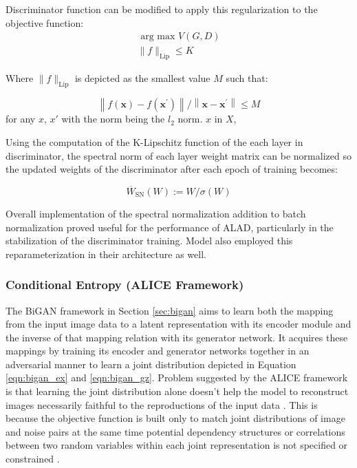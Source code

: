 Discriminator function can be modified to apply this regularization to the objective function: 
\begin{equation}
\begin{array}{l}{\text { arg max } V(G, D)} \\ {\|f\|_{\mathrm{Lip}} \leq K}\end{array} 
\end{equation}

Where $\|f\|_{\mathrm{Lip}}$ is depicted as the smallest value $M$ such that: 

\begin{equation}
    \left\|f(\boldsymbol{x})-f\left(\boldsymbol{x}^{\prime}\right)\right\| /\left\|\boldsymbol{x}-\boldsymbol{x}^{\prime}\right\| \leq M 
\end{equation}
for any $x$, $x'$ with the norm being the $l_2$ norm. $x$ in $X$,\cite{sohrab2011basic}

Using the computation of the K-Lipschitz function of the each layer in discriminator, the spectral
norm of each layer weight matrix can be normalized so the updated weights of the discriminator after
each epoch of training becomes:

\begin{equation}
    \overline{W}_{\mathrm{SN}}(W) :=W / \sigma(W) 
\end{equation}

Overall implementation of the spectral normalization addition to batch normalization proved useful for the performance of 
ALAD, particularly in the stabilization of the discriminator training. Model also employed this reparameterization in their 
architecture as well. 

\subsubsection{Conditional Entropy (ALICE Framework)}
\label{sec:alad_alice}

The BiGAN framework in Section \ref{sec:bigan} aims to learn both the mapping from the input image
data to a latent representation with its encoder module and the inverse of that mapping relation
with its generator network. It acquires these mappings by training its encoder and generator networks
together in an adversarial manner to learn a joint distribution depicted in Equation
\ref{eqn:bigan_ex} and \ref{eqn:bigan_gz}. Problem suggested by the ALICE
framework\cite{Li2017TowardsUA} is that learning the joint distribution alone doesn't help the model
to reconstruct images necessarily faithful to the reproductions of the input data
\cite{Li2017TowardsUA}. This is because the objective function is built only to match joint
distributions of image and noise pairs at the same time potential dependency structures or
correlations between two random variables within each joint representation is not specified or
constrained \cite{Li2017TowardsUA}.

